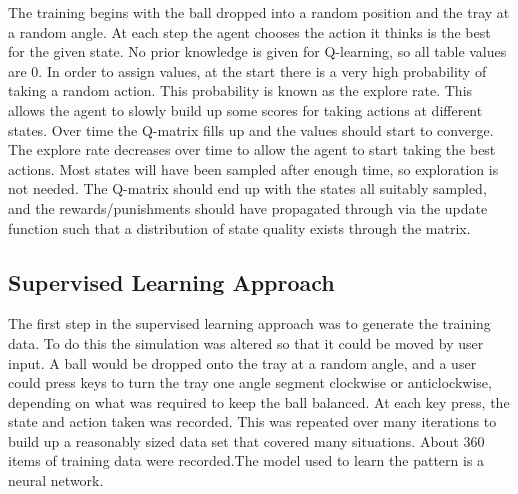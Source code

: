 \documentclass[12pt,a4paper]{article}
\begin{document}
The training begins with the ball dropped into a random position and the tray at a random angle. At each step the agent chooses the action it thinks is the best for the given state. No prior knowledge is given for Q-learning, so all table values are 0. In order to assign values, at the start there is a very high probability of taking a random action. This probability is known as the explore rate. This allows the agent to slowly build up some scores for taking actions at different states. Over time the Q-matrix fills up and the values should start to converge. The explore rate decreases over time to allow the agent to start taking the best actions. Most states will have been sampled after enough time, so exploration is not needed. The Q-matrix should end up with the states all suitably sampled, and the rewards/punishments should have propagated through via the update function such that a distribution of state quality exists through the matrix. 
\subsection{Supervised Learning Approach}
The first step in the supervised learning approach was to generate the training data. To do this the simulation was altered so that it could be moved by user input. A ball would be dropped onto the tray at a random angle, and a user could press keys to turn the tray one angle segment clockwise or anticlockwise, depending on what was required to keep the ball balanced. At each key press, the state and action taken was recorded. This was repeated over many iterations to build up a reasonably sized data set that covered many situations. About 360 items of training data were recorded.The model used to learn the pattern is a neural network.
\end{document}
